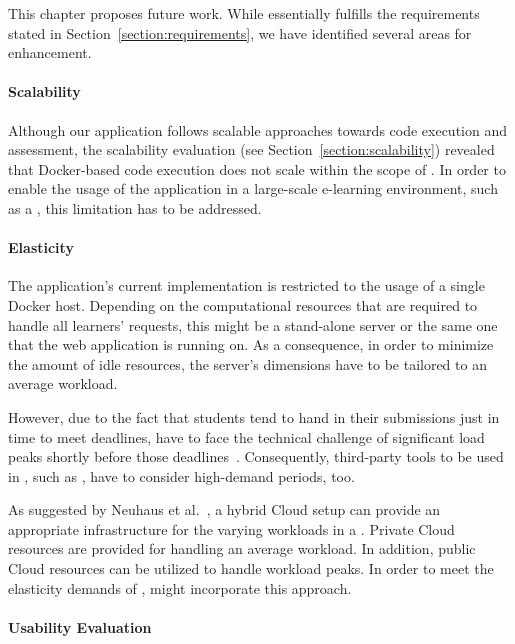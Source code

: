 This chapter proposes future work. While \tool essentially fulfills the requirements stated in Section~\ref{section:requirements}, we have identified several areas for enhancement.

\paragraph{Scalability}

Although our application follows scalable approaches towards code execution and assessment, the scalability evaluation (see Section~\ref{section:scalability}) revealed that Docker-based code execution does not scale within the scope of \tool. In order to enable the usage of the application in a large-scale e-learning environment, such as a \mooc, this limitation has to be addressed.

\paragraph{Elasticity}

The application's current implementation is restricted to the usage of a single Docker host. Depending on the computational resources that are required to handle all learners' requests, this might be a stand-alone server or the same one that the web application is running on. As a consequence, in order to minimize the amount of idle resources, the server's dimensions have to be tailored to an average workload.

However, due to the fact that students tend to hand in their submissions just in time to meet deadlines, \moocs have to face the technical challenge of significant load peaks shortly before those deadlines~\cite{higgins2003coursemarker,staubitz2014lightweight,vihavainen2012multi,willems2014motivating}. Consequently, third-party tools to be used in \moocs, such as \tool, have to consider high-demand periods, too.

As suggested by Neuhaus et al.~\cite{neuhaus2014platform}, a hybrid Cloud setup can provide an appropriate infrastructure for the varying workloads in a \mooc. Private Cloud resources are provided for handling an average workload. In addition, public Cloud resources can be utilized to handle workload peaks. In order to meet the elasticity demands of \moocs, \tool might incorporate this approach.

\paragraph{Usability Evaluation}

